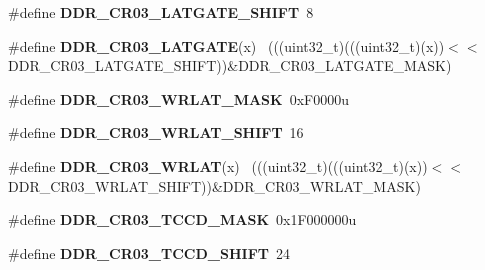 \begin{DoxyCompactItemize}
\item 
\hypertarget{group___d_d_r___register___masks_gaa8022b117432190416ef801de9d05df0}{}\#define {\bfseries D\+D\+R\+\_\+\+C\+R03\+\_\+\+L\+A\+T\+G\+A\+T\+E\+\_\+\+S\+H\+I\+F\+T}~8\label{group___d_d_r___register___masks_gaa8022b117432190416ef801de9d05df0}

\item 
\hypertarget{group___d_d_r___register___masks_gab03211651b35f74e685b3af6952f431c}{}\#define {\bfseries D\+D\+R\+\_\+\+C\+R03\+\_\+\+L\+A\+T\+G\+A\+T\+E}(x)                                        ~(((uint32\+\_\+t)(((uint32\+\_\+t)(x))$<$$<$D\+D\+R\+\_\+\+C\+R03\+\_\+\+L\+A\+T\+G\+A\+T\+E\+\_\+\+S\+H\+I\+F\+T))\&D\+D\+R\+\_\+\+C\+R03\+\_\+\+L\+A\+T\+G\+A\+T\+E\+\_\+\+M\+A\+S\+K)\label{group___d_d_r___register___masks_gab03211651b35f74e685b3af6952f431c}

\item 
\hypertarget{group___d_d_r___register___masks_ga64562ce55076f28a09c5baa0d262dca3}{}\#define {\bfseries D\+D\+R\+\_\+\+C\+R03\+\_\+\+W\+R\+L\+A\+T\+\_\+\+M\+A\+S\+K}~0x\+F0000u\label{group___d_d_r___register___masks_ga64562ce55076f28a09c5baa0d262dca3}

\item 
\hypertarget{group___d_d_r___register___masks_ga1b0caa2f58c8080f880f1fe5ce3e5f78}{}\#define {\bfseries D\+D\+R\+\_\+\+C\+R03\+\_\+\+W\+R\+L\+A\+T\+\_\+\+S\+H\+I\+F\+T}~16\label{group___d_d_r___register___masks_ga1b0caa2f58c8080f880f1fe5ce3e5f78}

\item 
\hypertarget{group___d_d_r___register___masks_gafc7d234d4ffdd78f563c577d3b71fc44}{}\#define {\bfseries D\+D\+R\+\_\+\+C\+R03\+\_\+\+W\+R\+L\+A\+T}(x)                                            ~(((uint32\+\_\+t)(((uint32\+\_\+t)(x))$<$$<$D\+D\+R\+\_\+\+C\+R03\+\_\+\+W\+R\+L\+A\+T\+\_\+\+S\+H\+I\+F\+T))\&D\+D\+R\+\_\+\+C\+R03\+\_\+\+W\+R\+L\+A\+T\+\_\+\+M\+A\+S\+K)\label{group___d_d_r___register___masks_gafc7d234d4ffdd78f563c577d3b71fc44}

\item 
\hypertarget{group___d_d_r___register___masks_gaf3d5fb4a30bbbe51b919c3ff3b2a52a5}{}\#define {\bfseries D\+D\+R\+\_\+\+C\+R03\+\_\+\+T\+C\+C\+D\+\_\+\+M\+A\+S\+K}~0x1\+F000000u\label{group___d_d_r___register___masks_gaf3d5fb4a30bbbe51b919c3ff3b2a52a5}

\item 
\hypertarget{group___d_d_r___register___masks_ga3f070883f0f315b2915c3364344851d0}{}\#define {\bfseries D\+D\+R\+\_\+\+C\+R03\+\_\+\+T\+C\+C\+D\+\_\+\+S\+H\+I\+F\+T}~24\label{group___d_d_r___register___masks_ga3f070883f0f315b2915c3364344851d0}


\end{DoxyCompactItemize}
